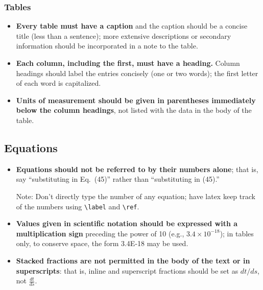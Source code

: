 \documentclass[12pt]{article}
\begin{document}
\subsubsection{Tables}

\begin{itemize}
\item {\bf Every table must have a caption} and the caption should be
  a concise title (less than a sentence); more extensive descriptions
  or secondary information should be incorporated in a note to the
  table.

\item {\bf Each column, including the first, must have a heading.}
  Column headings should label the entries concisely (one or two
  words); the first letter of each word is capitalized.

\item {\bf Units of measurement should be given in parentheses
    immediately below the column headings}, not listed with the data
  in the body of the table.

\end{itemize}

\subsection{Equations}

\begin{itemize}
\item {{\bf Equations should not be referred to by their numbers
      alone}; that is, say ``substituting in Eq.~(45)'' rather than
    ``substituting in (45).'' \par}

  {\footnotesize \sf Note: Don't directly type the number of any equation;
    have latex keep track of the numbers using \verb+\label+ and
    \verb+\ref+.\par}

\item {\bf Values given in scientific notation should be expressed
    with a multiplication sign} preceding the power of 10 (e.g.,
  $3.4\times10^{-18}$); in tables only, to conserve space, the form
  3.4E-18 may be used.

\item {\bf Stacked fractions are not permitted in the body of the text
    or in superscripts}: that is, inline and superscript fractions
  should be set as $dt /ds$, not $\frac{dt}{ds}$.
\end{itemize}
\end{document}
